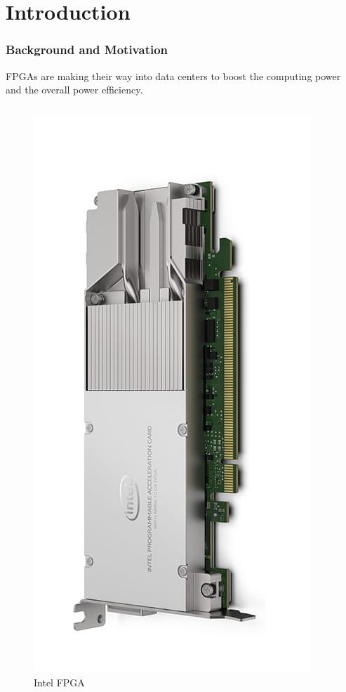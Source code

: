 \section{Introduction}
\begin{frame}
  \frametitle{Background and Motivation}

FPGAs are making their way into data centers to boost the computing power
	and the overall power efficiency.


\begin{columns}

\begin{column}{0.2\textwidth}
	\begin{figure}
\includegraphics[scale=0.15]{./background/intel_fpga_nic.jpg}
		\caption{Intel FPGA}
	\end{figure}
\end{column}


\end{columns}
\end{frame}
